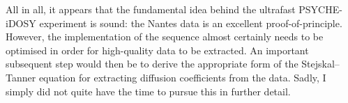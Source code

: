 All in all, it appears that the fundamental idea behind the ultrafast PSYCHE-iDOSY experiment is sound: the Nantes data is an excellent proof-of-principle.
However, the implementation of the sequence almost certainly needs to be optimised in order for high-quality data to be extracted.
An important subsequent step would then be to derive the appropriate form of the Stejskal--Tanner equation for extracting diffusion coefficients from the data.
Sadly, I simply did not quite have the time to pursue this in further detail.
